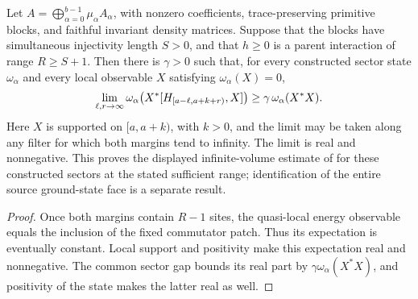 \begin{lemma}
    \label{thm:multiblock_quasi_local_commutator_limit_gap}
    \leanok
    Let $A=\bigoplus_{\alpha=0}^{b-1}\mu_\alpha A_\alpha$, with nonzero
    coefficients, trace-preserving primitive blocks, and faithful invariant
    density matrices. Suppose that the blocks have simultaneous injectivity
    length $S>0$, and that $h\geq0$ is a parent interaction of range
    $R\geq S+1$. Then there is $\gamma>0$ such that, for every constructed
    sector state $\omega_\alpha$ and every local observable $X$ satisfying
    $\omega_\alpha(X)=0$,
    \begin{align}
        \lim_{\ell,r\to\infty}
        \omega_\alpha\bigl(X^*[H_{[a-\ell,a+k+r)},X]\bigr)
        \geq \gamma\,\omega_\alpha(X^*X).
        \notag
    \end{align}
    Here $X$ is supported on $[a,a+k)$, with $k>0$, and the limit may be
    taken along any filter for which both margins tend to infinity.
    The limit is real and nonnegative. This proves the displayed
    infinite-volume estimate of \cite[Theorem~1.2]{Nachtergaele1996Spectral}
    for these constructed sectors at the stated sufficient range;
    identification of the entire source ground-state face is a separate result.
\end{lemma}
\begin{proof}\leanok
    Once both margins contain $R-1$ sites, the quasi-local energy observable
    equals the inclusion of the fixed commutator patch. Thus its expectation
    is eventually constant. Local support and positivity make this expectation
    real and nonnegative. The common sector gap bounds its real part by
    $\gamma\omega_\alpha(X^*X)$, and positivity of the state makes the latter
    real as well.
\end{proof}

